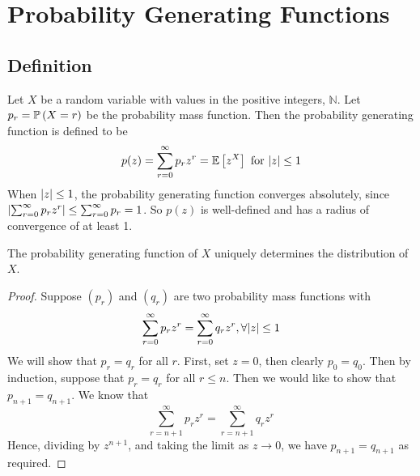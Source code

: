 \documentclass{article}
\begin{document}
\section{Probability Generating Functions}
\subsection{Definition}
Let $X$ be a random variable with values in the positive integers, $\mathbb N$. Let $p_r = \mathbb{P}\left({X = r}\right)$ be the probability mass function. Then the probability generating function is defined to be
\[ p(z) = \sum_{r=0}^\infty p_r z^r = \mathbb{E}\left[{z^X}\right] \text{ for } \abs{z} \leq 1 \]
When $\abs{z} \leq 1$, the probability generating function converges absolutely, since $\abs{\sum_{r=0}^\infty p_r z^r} \leq \sum_{r=0}^\infty p_r = 1$. So $p(z)$ is well-defined and has a radius of convergence of at least 1.
\begin{theorem}
	The probability generating function of $X$ uniquely determines the distribution of $X$.
\end{theorem}
\begin{proof}
	Suppose $(p_r)$ and $(q_r)$ are two probability mass functions with
	\[ \sum_{r=0}^\infty p_r z^r = \sum_{r=0}^\infty q_r z^r, \forall \abs{z} \leq 1 \]
	We will show that $p_r = q_r$ for all $r$. First, set $z = 0$, then clearly $p_0 = q_0$. Then by induction, suppose that $p_r = q_r$ for all $r \leq n$. Then we would like to show that $p_{n+1} = q_{n+1}$. We know that
	\[ \sum_{r=n+1}^\infty p_r z^r = \sum_{r=n+1}^\infty q_r z^r \]
	Hence, dividing by $z^{n+1}$, and taking the limit as $z \to 0$, we have $p_{n+1} = q_{n+1}$ as required.
\end{proof}
\end{document}
